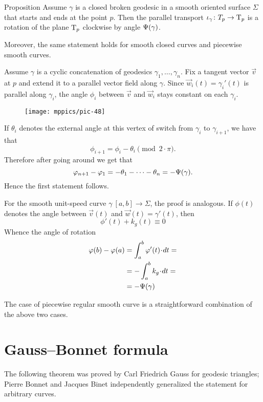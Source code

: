 \begin{thm}{Proposition}\label{prop:pt+tgc}
Assume $\gamma$ is a closed broken geodesic in a smooth oriented surface $\Sigma$ that starts and ends at the point $p$.
Then the parallel transport $\iota_\gamma\colon T_p\to\mathrm{T}_p$ is a rotation of the plane $\mathrm{T}_p$ clockwise by angle $\Psi({\gamma})$.

Moreover, the same statement holds for smooth closed curves and piecewise smooth curves.
\end{thm}

Assume $\gamma$ is a cyclic concatenation of geodesics $\gamma_1,\dots,\gamma_n$.
Fix a tangent vector ${\vec v}$ at $p$ and extend it to a parallel vector field along $\gamma$.
Since ${\vec w}_i(t)=\gamma_i'(t)$ is parallel along $\gamma_i$, the angle $\phi_i$ between ${\vec v}$ and ${\vec w}_i$ stays constant on each $\gamma_i$.

\begin{wrapfigure}{o}{22 mm}
\vskip-0mm
\centering
\texttt{[image: mppics/pic-48]}
\vskip-0mm
\end{wrapfigure}

If $\theta_i$ denotes the external angle at this vertex of switch from $\gamma_{i}$ to $\gamma_{i+1}$, we have that 
\[\phi_{i+1}=\phi_i-\theta_i \pmod{2\cdot\pi}.\]
Therefore after going around we get that 
\[\varphi_{n+1}-\varphi_1=-\theta_1-\dots-\theta_n=-\Psi({\gamma}).\]
Hence the first statement follows.

For the smooth unit-speed curve $\gamma\:[a,b]\to\Sigma$, the proof is analogous.
If $\phi(t)$ denotes the angle between ${\vec v}(t)$ and ${\vec w}(t)=\gamma'(t)$, then 
\[\phi'(t)+k_g(t)\equiv0\]
Whence the angle of rotation 
\begin{align*}
\phi(b)-\phi(a)&=\int_a^b \phi'(t)\cdot dt=
\\
&=-\int_a^b k_g\cdot dt=
\\
&=-\tgc\gamma
\end{align*}

The case of piecewise regular smooth curve is a straightforward combination of the above two cases. 
\qeds

\chapter{Gauss--Bonnet formula}

The following theorem was proved by Carl Friedrich Gauss \cite{gauss}
for geodesic triangles;
Pierre Bonnet and Jacques Binet independently 
generalized the statement for arbitrary curves.


